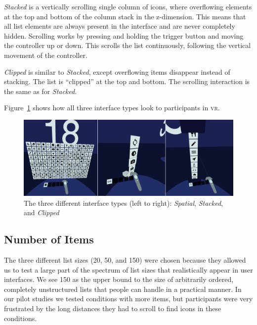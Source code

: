 \documentclass[nobib]{tufte-book} %
\begin{document}
\emph{Stacked} is a vertically scrolling single column of icons, where overflowing elements at the top and bottom of the column stack in the z-dimension. This means that all list elements are always present in the interface and are never completely hidden. Scrolling works by pressing and holding the trigger button and moving the controller up or down. This scrolls the list continuously, following the vertical movement of the controller.

\emph{Clipped} is similar to \emph{Stacked}, except overflowing items disappear instead of stacking. The list is ``clipped'' at the top and bottom. The scrolling interaction is the same as for \emph{Stacked}.

Figure~\ref{fig:interface-types} shows how all three interface types look to participants in \textsc{vr}.

\begin{figure}[h]
\includegraphics[width=\linewidth]{interface-types.png}
\caption{The three different interface types (left to right): \emph{Spatial}, \emph{Stacked}, and \emph{Clipped}}
\label{fig:interface-types}
\end{figure}

\subsection{Number of Items}
The three different list sizes (20, 50, and 150) were chosen because they allowed us to test a large part of the spectrum of list sizes that realistically appear in user interfaces. We see 150 as the upper bound to the size of arbitrarily ordered, completely unstructured lists that people can handle in a practical manner. In our pilot studies we tested conditions with more items, but participants were very frustrated by the long distances they had to scroll to find icons in these conditions.
\end{document}
